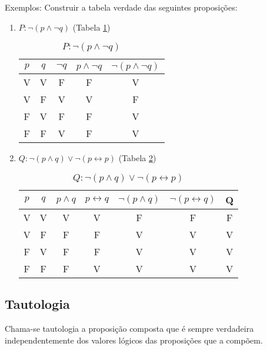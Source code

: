 Exemplos: Construir a tabela verdade das seguintes proposi{\c c}{\~o}es:
\begin{enumerate}
\item $P:\neg(p\wedge\neg q)$ (Tabela \ref{1})
\begin{table}[h]
   \centering 
   \setlength{\arrayrulewidth}{0,5\arrayrulewidth}
   \caption{\it $P:\neg(p\wedge\neg q)$}
   \begin{tabular}{|c|c|c|c|c|} 
      \hline
      $p$ & $q$ & $\neg q$ & $p\wedge\neg q$ & $\neg(p\wedge\neg q)$ \\
     \hline
      V & V & F & F & V \\
      \hline
      V & F & V & V & F \\
      \hline
      F & V & F & F & V \\
      \hline
      F & F & V & F & V \\
      \hline
   \end{tabular}
\label{1}
\end{table}
\item $Q:\neg(p\wedge q)\vee\neg(p\leftrightarrow p)$ (Tabela \ref{2})
\begin{table}[h]
   \centering 
   \setlength{\arrayrulewidth}{0,5\arrayrulewidth}
   \caption{\it $Q:\neg(p\wedge q)\vee\neg(p\leftrightarrow p)$}
   \begin{tabular}{|c|c|c|c|c|c|c|} 
      \hline
      $p$ & $q$ & $p\wedge q$ & $p\leftrightarrow q$ & $\neg(p\wedge q)$ & $\neg(p\leftrightarrow q)$ & Q \\
     \hline
      V & V & V & V & F & F & F \\
      \hline
      V & F & F & F & V & V & V\\
      \hline
      F & V & F & F & V & V & V \\
      \hline
      F & F & F & V & V & V & V \\
      \hline
   \end{tabular}
\label{2}
\end{table}
\end{enumerate}

\subsection{Tautologia}
\begin{definicao}[Tautologia] Chama-se tautologia a proposi{\c c}{\~a}o composta que {\'e} sempre verdadeira independentemente dos valores l{\'o}gicos das proposi{\c c}{\~o}es que a comp{\~o}em.\end{definicao}

